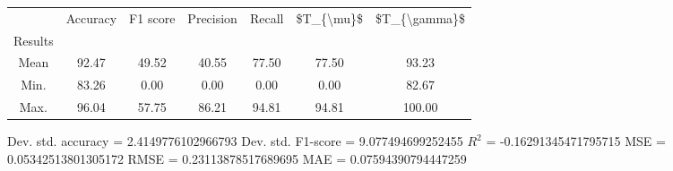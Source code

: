 \begin{tabular}{|c|c|c|c|c|c|c|}
\toprule
{} &  Accuracy &  F1 score &  Precision &  Recall &  \$T\_\{\textbackslash mu\}\$ &  \$T\_\{\textbackslash gamma\}\$ \\
Results &           &           &            &         &            &               \\
\hline
Mean    &     92.47 &     49.52 &      40.55 &   77.50 &      77.50 &         93.23 \\
Min.    &     83.26 &      0.00 &       0.00 &    0.00 &       0.00 &         82.67 \\
Max.    &     96.04 &     57.75 &      86.21 &   94.81 &      94.81 &        100.00 \\
\bottomrule
\end{tabular}

 Dev. std. accuracy = 2.4149776102966793
 Dev. std. F1-score = 9.077494699252455
 $R^2$ = -0.16291345471795715
 MSE = 0.05342513801305172
 RMSE = 0.23113878517689695
 MAE = 0.07594390794447259